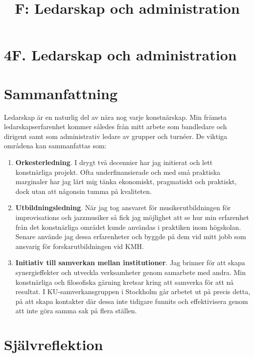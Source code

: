 \documentclass[a4paper]{article}
\title{F: Ledarskap och administration}
\date{}
\begin{document}

\thispagestyle{empty}

\section*{\textsf{4F. Ledarskap och administration}}

\section*{\textsf{Sammanfattning}}

Ledarskap är en naturlig del av nära nog varje konstnärskap. Min främsta ledarskapserfarenhet kommer således från mitt arbete som bandledare och dirigent samt som administrativ ledare av grupper och turnéer. De viktiga områdena kan sammanfattas som:

\begin{enumerate}
\item \textbf{Orkesterledning}. I drygt två decennier har jag initierat och lett konstnärliga projekt. Ofta underfinansierade och med små praktiska marginaler har jag lärt mig tänka ekonomiskt, pragmatiskt och praktiskt, dock utan att någonsin tumma på kvaliteten. 
\item \textbf{Utbildningsledning}. När jag tog ansvaret för musikerutbildningen för improvisations och jazzmusiker så fick jag möjlighet att se hur min erfarenhet från det konstnärliga området kunde användas i praktiken inom högskolan. Senare använde jag dessa erfarenheter och byggde på dem vid mitt jobb som ansvarig för forskarutbildningen vid KMH.
\item \textbf{Initiativ till samverkan mellan institutioner}. Jag brinner för att skapa synergieffekter och utveckla verksamheter genom samarbete med andra. Min konstnärliga och filosofiska gärning kretsar kring att samverka för att nå resultat. I KU-samverkansgruppen i Stockholm går arbetet ut på precis detta, på att skapa kontakter där dessa inte tidigare funnits och effektivisera genom att inte göra samma sak på flera ställen.
\end{enumerate}

\section*{\textsf{Självreflektion}}
\end{document}
